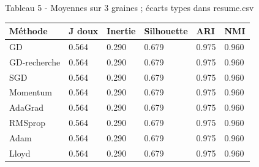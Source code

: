 \documentclass[10pt,a4paper]{article}
\begin{document}
\begin{center}{\footnotesize Tableau 5 - Moyennes sur 3 graines ; écarts types dans resume.csv\par\medskip\begin{tabular}{llllll}\toprule
Méthode & J doux & Inertie & Silhouette & ARI & NMI \\
\midrule
GD & 0.564 & 0.290 & 0.679 & 0.975 & 0.960 \\
GD-recherche & 0.564 & 0.290 & 0.679 & 0.975 & 0.960 \\
SGD & 0.564 & 0.290 & 0.679 & 0.975 & 0.960 \\
Momentum & 0.564 & 0.290 & 0.679 & 0.975 & 0.960 \\
AdaGrad & 0.564 & 0.290 & 0.679 & 0.975 & 0.960 \\
RMSprop & 0.564 & 0.290 & 0.679 & 0.975 & 0.960 \\
Adam & 0.564 & 0.290 & 0.679 & 0.975 & 0.960 \\
Lloyd & 0.564 & 0.290 & 0.679 & 0.975 & 0.960 \\
\bottomrule\end{tabular}}\end{center}
\end{document}
